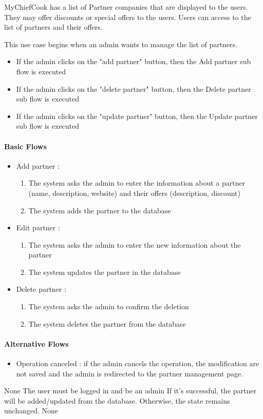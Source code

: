{
  MyChiefCook has a list of Partner companies that are displayed to the users. They may offer discounts or special offers to the users. Users can access to the list of partners and their offers.

}
{
  This use case begins when an admin wants to manage the list of partners.

  \begin{itemize}
    \item If the admin clicks on the "add partner" button, then the Add partner sub flow is executed
    \item If the admin clicks on the "delete partner" button, then the Delete partner sub flow is executed
    \item If the admin clicks on the "update partner" button, then the Update partner sub flow is executed
  \end{itemize}

  \paragraph{Basic Flows}
  \begin{itemize}
    \item Add partner :
    \begin{enumerate}
      \item The system asks the admin to enter the information about a partner (name, description, website) and their offers (description, discount)
      \item The system adds the partner to the database
    \end{enumerate}
    \item Edit partner :
    \begin{enumerate}
      \item The system asks the admin to enter the new information about the partner
      \item The system updates the partner in the database
    \end{enumerate}
    \item Delete partner :
    \begin{enumerate}
      \item The system asks the admin to confirm the deletion
      \item The system deletes the partner from the database
    \end{enumerate}
  \end{itemize}

  \paragraph{Alternative Flows}
  \begin{itemize}
    \item Operation canceled : if the admin cancels the operation, the modification are not saved and the admin is redirected to the partner management page.
  \end{itemize}
}
{None}
{The user must be logged in and be an admin}
{If it’s successful, the partner will be added/updated from the database. Otherwise, the state remains unchanged.}
{None}